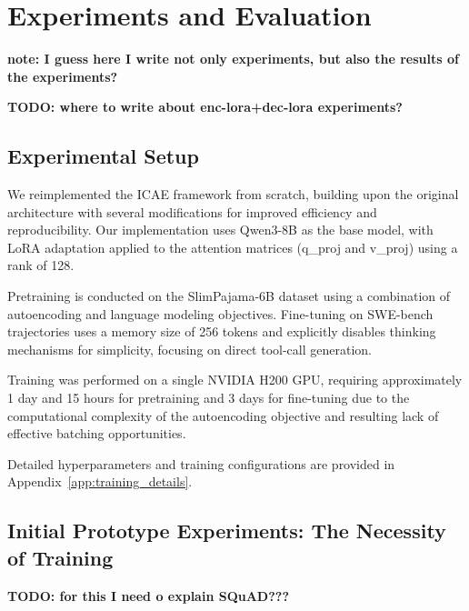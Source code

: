 \chapter{Experiments and Evaluation}

\textbf{note: I guess here I write not only experiments, but also the results of the experiments?}

\textbf{TODO: where to write about enc-lora+dec-lora experiments?}


\section{Experimental Setup}

We reimplemented the ICAE framework from scratch, building upon the original architecture \cite{ge_-context_2024} with several modifications for improved efficiency and reproducibility. Our implementation uses Qwen3-8B as the base model, with LoRA adaptation applied to the attention matrices (q\_proj and v\_proj) using a rank of 128.

Pretraining is conducted on the SlimPajama-6B dataset using a combination of autoencoding and language modeling objectives. Fine-tuning on SWE-bench trajectories uses a memory size of 256 tokens and explicitly disables thinking mechanisms for simplicity, focusing on direct tool-call generation.

Training was performed on a single NVIDIA H200 GPU, requiring approximately 1 day and 15 hours for pretraining and 3 days for fine-tuning due to the computational complexity of the autoencoding objective and resulting lack of effective batching opportunities.

Detailed hyperparameters and training configurations are provided in Appendix~\ref{app:training_details}.


\section{Initial Prototype Experiments: The Necessity of Training}

\textbf{TODO: for this I need o explain SQuAD???}

